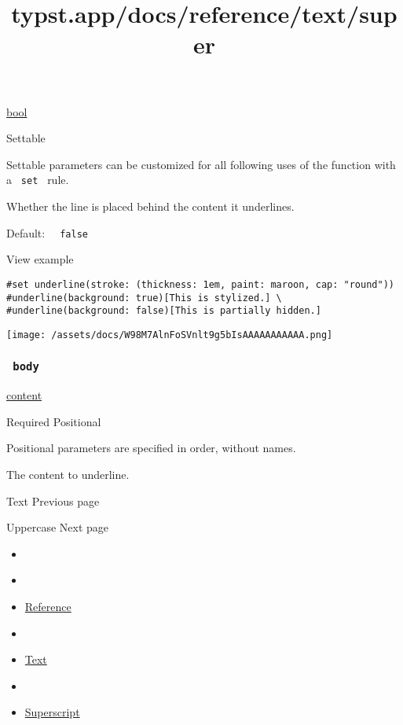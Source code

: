 \href{/docs/reference/foundations/bool/}{bool}

{{ Settable }}

\label{parameters-background-settable-tooltip}
Settable parameters can be customized for all following uses of the
function with a \texttt{\ set\ } rule.

Whether the line is placed behind the content it underlines.

Default: \texttt{\ }{\texttt{\ false\ }}\texttt{\ }


View example

\begin{verbatim}
#set underline(stroke: (thickness: 1em, paint: maroon, cap: "round"))
#underline(background: true)[This is stylized.] \
#underline(background: false)[This is partially hidden.]
\end{verbatim}

\texttt{[image: /assets/docs/W98M7AlnFoSVnlt9g5bIsAAAAAAAAAAA.png]}

\subsubsection{\texorpdfstring{\texttt{\ body\ }}{ body }}\label{parameters-body}

\href{/docs/reference/foundations/content/}{content}

{Required} {{ Positional }}

\label{parameters-body-positional-tooltip}
Positional parameters are specified in order, without names.

The content to underline.

\href{/docs/reference/text/text/}{\pandocbounded{}}

{ Text } { Previous page }

\href{/docs/reference/text/upper/}{\pandocbounded{}}

{ Uppercase } { Next page }


\title{typst.app/docs/reference/text/super}

\begin{itemize}
\tightlist
\item
  \href{/docs}{}
\item
  
\item
  \href{/docs/reference/}{Reference}
\item
  
\item
  \href{/docs/reference/text/}{Text}
\item
  
\item
  \href{/docs/reference/text/super/}{Superscript}
\end{itemize}


